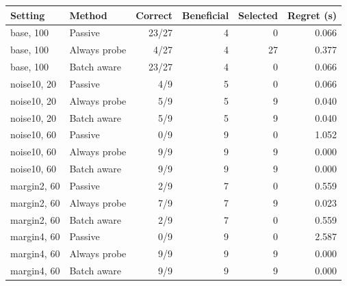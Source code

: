 \begin{tabular}{llrrrr}\toprule
Setting & Method & Correct & Beneficial & Selected & Regret (s)\\\midrule
base, 100 & Passive & 23/27 & 4 & 0 & 0.066\\
base, 100 & Always probe & 4/27 & 4 & 27 & 0.377\\
base, 100 & Batch aware & 23/27 & 4 & 0 & 0.066\\
noise10, 20 & Passive & 4/9 & 5 & 0 & 0.066\\
noise10, 20 & Always probe & 5/9 & 5 & 9 & 0.040\\
noise10, 20 & Batch aware & 5/9 & 5 & 9 & 0.040\\
noise10, 60 & Passive & 0/9 & 9 & 0 & 1.052\\
noise10, 60 & Always probe & 9/9 & 9 & 9 & 0.000\\
noise10, 60 & Batch aware & 9/9 & 9 & 9 & 0.000\\
margin2, 60 & Passive & 2/9 & 7 & 0 & 0.559\\
margin2, 60 & Always probe & 7/9 & 7 & 9 & 0.023\\
margin2, 60 & Batch aware & 2/9 & 7 & 0 & 0.559\\
margin4, 60 & Passive & 0/9 & 9 & 0 & 2.587\\
margin4, 60 & Always probe & 9/9 & 9 & 9 & 0.000\\
margin4, 60 & Batch aware & 9/9 & 9 & 9 & 0.000\\
\bottomrule\end{tabular}